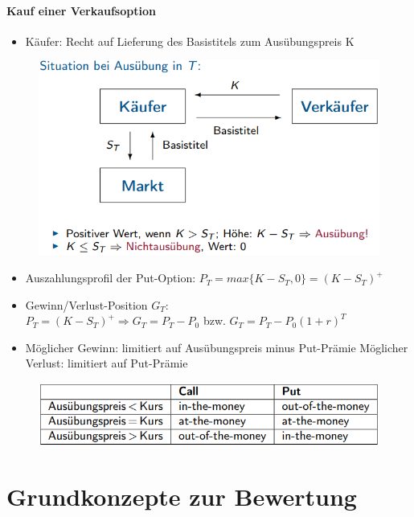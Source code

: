 \documentclass[12pt]{report}
\theoremstyle{dotless}
\theoremstyle{definition}
\begin{document}
\subsubsection{Kauf einer Verkaufsoption}
\begin{itemize}
\item Käufer: Recht auf Lieferung des Basistitels zum Ausübungspreis K
\end{itemize}
\vspace{0.3cm}
\begin{figure}[ht]
	\centering
	\includegraphics[width=0.7 \textwidth]{Bilder/Verkaufoption.png}
\end{figure}
\vspace{0.3cm}
\begin{itemize}
\item Auszahlungsprofil der Put-Option: $P_T = max \{K-S_T, 0\} = (K-S_T)^+$
\item Gewinn/Verlust-Position $G_T$: \\
$P_T = (K-S_T)^+ \Rightarrow G_T=P_T-P_0$ bzw. $G_T=P_T-P_0(1+r)^T$
\item Möglicher Gewinn: limitiert auf Ausübungspreis minus Put-Prämie
Möglicher Verlust: limitiert auf Put-Prämie
\end{itemize}

\begin{figure}[ht]
	\centering
	\includegraphics[width=0.7 \textwidth]{Bilder/ImGeld.png}
\end{figure}




\chapter{Grundkonzepte zur Bewertung} 
\end{document}

